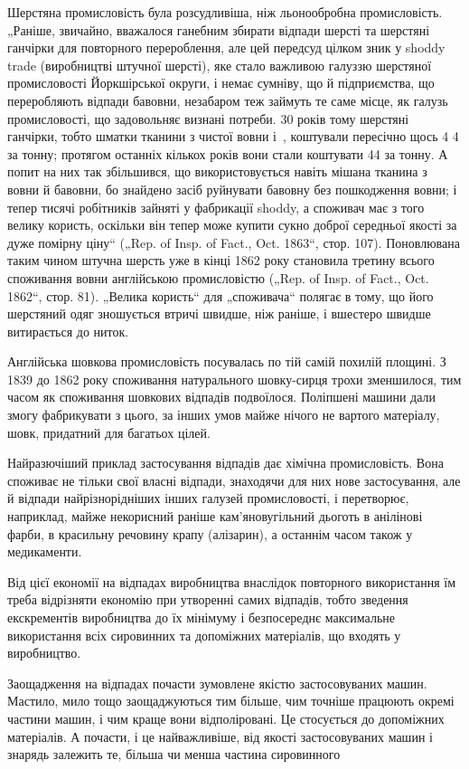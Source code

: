 
Шерстяна промисловість була розсудливіша, ніж льонообробна промисловість. „Раніше, звичайно,
вважалося ганебним
збирати відпади шерсті та шерстяні ганчірки для повторного
перероблення, але цей передсуд цілком зник у shoddy trade
(виробництві штучної шерсті), яке стало важливою галуззю
шерстяної промисловості Йоркшірської округи, і немає сумніву,
що й підприємства, що переробляють відпади бавовни, незабаром теж займуть те саме місце, як галузь
промисловості, що
задовольняє визнані потреби. 30 років тому шерстяні ганчірки,
тобто шматки тканини з чистої вовни і~, коштували пересічно щось 4 4
за тонну; протягом
останніх кількох років вони стали коштувати 44 за тонну. А попит на них так
збільшився, що використовується
навіть мішана тканина з вовни й бавовни, бо знайдено засіб
руйнувати бавовну без пошкодження вовни; і тепер тисячі робітників зайняті у фабрикації shoddy, а
споживач має з того
велику користь, оскільки він тепер може купити сукно доброї
середньої якості за дуже помірну ціну“ („Rep. of Insp. of Fact.,
Oct. 1863“, стор. 107). Поновлювана таким чином штучна шерсть
уже в кінці 1862 року становила третину всього споживання
вовни англійською промисловістю („Rep. of Insp. of Fact., Oct.
1862“, стор. 81). „Велика користь“ для „споживача“ полягає в тому,
що його шерстяний одяг зношується втричі швидше, ніж раніше,
і вшестеро швидше витирається до ниток.

Англійська шовкова промисловість посувалась по тій самій
похилій площині. З 1839 до 1862 року споживання натурального
шовку-сирця трохи зменшилося, тим часом як споживання шовкових відпадів подвоїлося. Поліпшені машини
дали змогу фабрикувати з цього, за інших умов майже нічого не вартого матеріалу, шовк, придатний для
багатьох цілей.

Найразючіший приклад застосування відпадів дає хімічна
промисловість. Вона споживає не тільки свої власні відпади,
знаходячи для них нове застосування, але й відпади найрізнорідніших інших галузей промисловості, і
перетворює, наприклад,
майже некорисний раніше кам’яновугільний дьоготь в анілінові
фарби, в красильну речовину крапу (алізарин), а останнім часом
також у медикаменти.

Від цієї економії на відпадах виробництва внаслідок повторного використання їм треба відрізняти
економію при утворенні
самих відпадів, тобто зведення екскрементів виробництва до
їх мінімуму і безпосереднє максимальне використання всіх сировинних та допоміжних матеріалів, що
входять у виробництво.

Заощадження на відпадах почасти зумовлене якістю застосовуваних машин. Мастило, мило тощо
заощаджуються тим
більше, чим точніше працюють окремі частини машин, і чим краще
вони відполіровані. Це стосується до допоміжних матеріалів.
А почасти, і це найважливіше, від якості застосовуваних машин
і знарядь залежить те, більша чи менша частина сировинного
\parbreak{}  %
